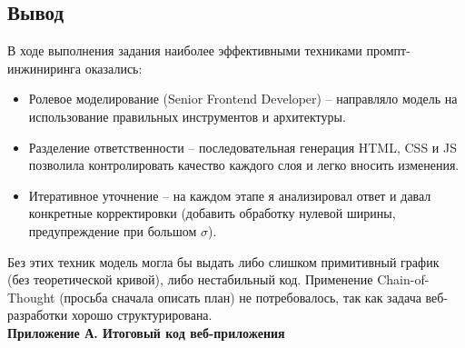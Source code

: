 \subsection{Вывод}
В ходе выполнения задания наиболее эффективными техниками промпт-инжиниринга оказались:
\begin{itemize}
	\item Ролевое моделирование (Senior Frontend Developer) – направляло модель на использование правильных инструментов и архитектуры.
	\item Разделение ответственности – последовательная генерация HTML, CSS и JS позволила контролировать качество каждого слоя и легко вносить изменения.
\newpage
	\item Итеративное уточнение – на каждом этапе я анализировал ответ и давал конкретные корректировки (добавить обработку нулевой ширины, предупреждение при большом $\sigma$).
\end{itemize}
Без этих техник модель могла бы выдать либо слишком примитивный график (без теоретической кривой), либо нестабильный код.
Применение Chain-of-Thought (просьба сначала описать план) не потребовалось, так как задача веб-разработки хорошо структурирована.\\
\newline
\noindent
\textbf{Приложение А. Итоговый код веб-приложения} \\
